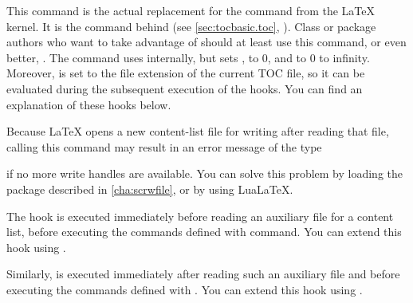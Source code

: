 \begin{Declaration}
\end{Declaration}
This command is the actual replacement for the
 command
from the \LaTeX{} kernel. It is the command behind
 (see \autoref{sec:tocbasic.toc},
). Class or package authors who want to
take advantage of  should at least use this command, or even
better, . The command uses
\Macro{\@starttoc} internally, but sets
,
 to 0, and  to 0
to infinity. Moreover,
 is set to the
file extension of the current TOC file, so it can be evaluated during the
subsequent execution of the hooks. You can find an explanation of these hooks
below.

Because \LaTeX{} opens a new content-list file for
writing after reading that file, calling this command may result in an error
message of the type
if no more write handles are available. You can solve this problem by loading
the 
package described in \autoref{cha:scrwfile}, or by using Lua\LaTeX{}.%
\EndIndexGroup


\begin{Declaration}
\end{Declaration}
The  hook is executed immediately before reading
an auxiliary file for a content list, before executing the commands defined
with  command. You can extend this
hook using .

Similarly,  is executed immediately after reading
such an auxiliary file and before executing the commands defined with
. You can extend this hook using
.

